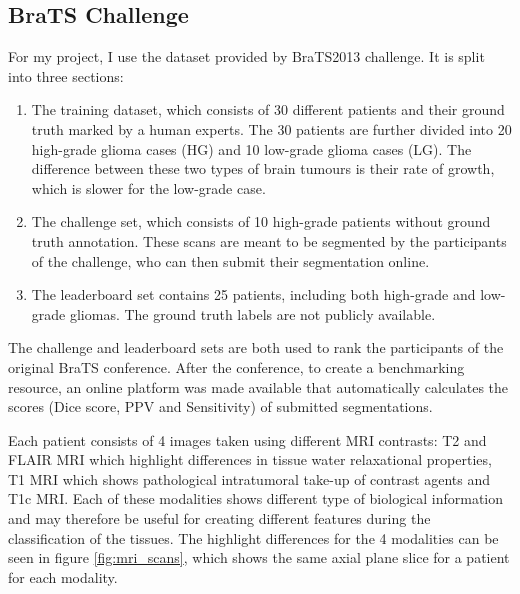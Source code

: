 \documentclass[12pt,a4paper,twoside,openright]{report}
\begin{document}
\subsection{BraTS Challenge}
For my project, I use the dataset provided by BraTS2013\cite{menze:hal-00935640} challenge. It is split into three sections:
\begin{enumerate}
	\item The training dataset, which consists of 30 different patients and their ground truth marked by a human experts. The 30 patients are further divided into 20 high-grade glioma cases (HG) and 10 low-grade glioma cases (LG). The difference between these two types of brain tumours is their rate  of growth, which is slower for the low-grade case.
	\item The challenge set, which consists of 10 high-grade patients without ground truth annotation. These scans are meant to be segmented by the participants of the challenge, who can then submit their segmentation online. 	
	\item The leaderboard set contains 25 patients, including both high-grade and low-grade gliomas. The ground truth labels are not publicly available.
\end{enumerate}
The challenge and leaderboard sets are both used to rank the participants of the original BraTS conference. After the conference, to create a benchmarking resource, an online platform was made available that automatically calculates the scores (Dice score, PPV and Sensitivity) of submitted segmentations.

Each patient consists of 4 images taken using different MRI contrasts: T2 and FLAIR MRI which highlight differences in tissue water relaxational properties, T1 MRI which shows pathological intratumoral take-up of contrast agents and T1c MRI. Each of these modalities shows different type of biological information and may therefore be useful for creating different features during the classification of the tissues. The highlight differences for the 4 modalities can be seen in figure \ref{fig:mri_scans}, which shows the same axial plane slice for a patient for each modality. 
\end{document}

